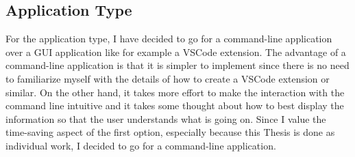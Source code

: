 \subsection{Application Type}
For the application type,
I have decided to go for a command-line application over a GUI application like for example a VSCode extension.
The advantage of a command-line application is that it is simpler to implement
since there is no need to familiarize myself with the details of how to create a VSCode extension or similar.
On the other hand,
it takes more effort to make the interaction with the command line intuitive
and it takes some thought about how to best display the information so that the user understands what is going on.
Since I value the time-saving aspect of the first option,
especially because this Thesis is done as individual work,
I decided to go for a command-line application.

